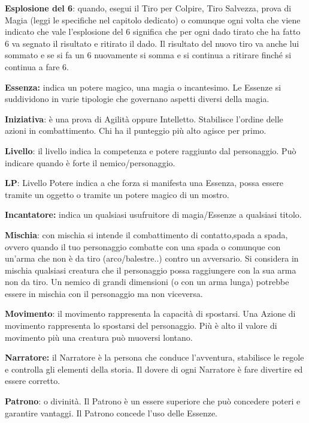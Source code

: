 \documentclass[a4paper,11pt,twoside,openany]{book}
\begin{document}
\textbf{Esplosione del 6}: quando, esegui il Tiro per Colpire, Tiro Salvezza, prova di Magia (leggi le specifiche nel capitolo dedicato) o comunque ogni volta che viene indicato che vale l'esplosione del 6 significa che per ogni dado tirato che ha fatto 6 va segnato il risultato e ritirato il dado. Il risultato del nuovo tiro va anche lui sommato e se si fa un 6 nuovamente si somma e si continua a ritirare finché si continua a fare 6.

\textbf{Essenza:} indica un potere magico, una magia o incantesimo. Le Essenze si suddividono in varie tipologie che governano aspetti diversi della magia.

\textbf{Iniziativa}: è una prova di Agilità oppure Intelletto. Stabilisce l'ordine delle azioni in combattimento. Chi ha il punteggio più alto agisce per primo.

\textbf{Livello}: il livello indica la competenza e potere raggiunto dal personaggio. Può indicare quando è forte il nemico/personaggio.

\textbf{LP}: Livello Potere indica a che forza si manifesta una Essenza, possa essere tramite un oggetto o tramite un potere magico di un mostro.

\textbf{Incantatore:} indica un qualsiasi usufruitore di magia/Essenze a qualsiasi titolo.

\textbf{Mischia}: con mischia si intende il combattimento di contatto,spada a spada, ovvero quando il tuo personaggio combatte con una spada o comunque con un'arma che non è da tiro (arco/balestre..) contro un avversario.
Si considera in mischia qualsiasi creatura che il personaggio possa raggiungere con la sua arma non da tiro. Un nemico di grandi dimensioni (o con un arma lunga) potrebbe essere in mischia con il personaggio ma non viceversa.

\textbf{Movimento}: il movimento rappresenta la capacità di spostarsi. Una Azione di movimento rappresenta lo spostarsi del personaggio. Più è alto il valore di movimento più una creatura può muoversi lontano.

\textbf{Narratore:} il Narratore è la persona che conduce l'avventura, stabilisce le regole e controlla gli elementi della storia. Il dovere di ogni Narratore è fare divertire ed essere corretto.

\textbf{Patrono}: o divinità. Il Patrono è un essere superiore che può concedere poteri e garantire vantaggi. Il Patrono concede l'uso delle Essenze.
\end{document}
